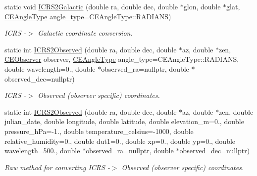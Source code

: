 \begin{DoxyCompactItemize}
static void \hyperlink{class_c_e_coordinates_afaea845380366fb186f744457e42cd50}{I\+C\+R\+S2\+Galactic} (double ra, double dec, double $\ast$glon, double $\ast$glat, \hyperlink{namespace_cpp_ephem_a9a974f6ccf329e8cb5f9208b725f15ef}{C\+E\+Angle\+Type} angle\+\_\+type=C\+E\+Angle\+Type\+::\+R\+A\+D\+I\+A\+N\+S)
\begin{DoxyCompactList}\small\item\em I\+C\+R\+S -\/$>$ Galactic coordinate conversion. \end{DoxyCompactList}\item 
static int \hyperlink{class_c_e_coordinates_a2c71eeacb95897d5ef1b59312565a7c6}{I\+C\+R\+S2\+Observed} (double ra, double dec, double $\ast$az, double $\ast$zen, \hyperlink{class_c_e_observer}{C\+E\+Observer} observer, \hyperlink{namespace_cpp_ephem_a9a974f6ccf329e8cb5f9208b725f15ef}{C\+E\+Angle\+Type} angle\+\_\+type=C\+E\+Angle\+Type\+::\+R\+A\+D\+I\+A\+N\+S, double wavelength=0., double $\ast$observed\+\_\+ra=nullptr, double $\ast$observed\+\_\+dec=nullptr)
\begin{DoxyCompactList}\small\item\em I\+C\+R\+S -\/$>$ Observed (observer specific) coordinates. \end{DoxyCompactList}\item 
static int \hyperlink{class_c_e_coordinates_a336c5a3251f88c3f62b2d9c3d964a8c6}{I\+C\+R\+S2\+Observed} (double ra, double dec, double $\ast$az, double $\ast$zen, double julian\+\_\+date, double longitude, double latitude, double elevation\+\_\+m=0., double pressure\+\_\+h\+Pa=-\/1., double temperature\+\_\+celsius=-\/1000, double relative\+\_\+humidity=0., double dut1=0., double xp=0., double yp=0., double wavelength=500., double $\ast$observed\+\_\+ra=nullptr, double $\ast$observed\+\_\+dec=nullptr)
\begin{DoxyCompactList}\small\item\em Raw method for converting I\+C\+R\+S -\/$>$ Observed (observer specific) coordinates. \end{DoxyCompactList}\end{DoxyCompactItemize}
